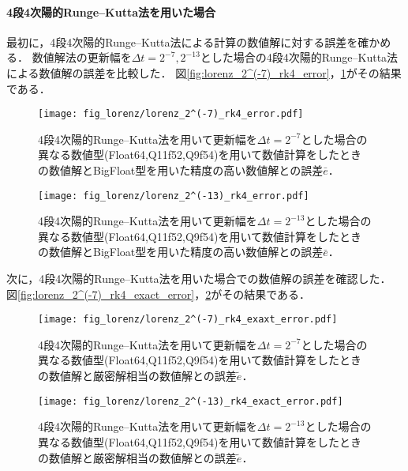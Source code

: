 \paragraph*{4段4次陽的Runge--Kutta法を用いた場合}
最初に，4段4次陽的Runge--Kutta法による計算の数値解に対する誤差を確かめる．
数値解法の更新幅を$\Delta t = 2^{-7},2^{-13}$とした場合の4段4次陽的Runge--Kutta法による数値解の誤差を比較した．
図\ref{fig:lorenz_2^(-7)_rk4_error}，\ref{fig:lorenz_2^(-13)_rk4_error}がその結果である．
\begin{figure}[H]
    \centering
    \begin{minipage}[b]{0.48\columnwidth}
        \centering
        \texttt{[image: fig\_lorenz/lorenz\_2^(-7)\_rk4\_error.pdf]}
        \caption{4段4次陽的Runge--Kutta法を用いて更新幅を$\Delta t = 2^{-7}$とした場合の異なる数値型(Float64,Q11f52,Q9f54)を用いて数値計算をしたときの数値解とBigFloat型を用いた精度の高い数値解との誤差$\bar{e}$．}
        \label{fig:lorenz_2^(-7)_rk4_error}
    \end{minipage}
    \hspace{0.01\columnwidth}
    \begin{minipage}[b]{0.48\columnwidth}
        \centering
        \texttt{[image: fig\_lorenz/lorenz\_2^(-13)\_rk4\_error.pdf]}
        \caption{4段4次陽的Runge--Kutta法を用いて更新幅を$\Delta t =  2^{-13}$とした場合の異なる数値型(Float64,Q11f52,Q9f54)を用いて数値計算をしたときの数値解とBigFloat型を用いた精度の高い数値解との誤差$\bar{e}$．}
        \label{fig:lorenz_2^(-13)_rk4_error}
    \end{minipage}
\end{figure}
次に，4段4次陽的Runge--Kutta法を用いた場合での数値解の誤差を確認した．
図\ref{fig:lorenz_2^(-7)_rk4_exact_error}，\ref{fig:lorenz_2^(-13)_rk4_exact_error}がその結果である．
\begin{figure}[H]
    \centering
    \begin{minipage}[b]{0.48\columnwidth}
        \centering
        \texttt{[image: fig\_lorenz/lorenz\_2^(-7)\_rk4\_exaxt\_error.pdf]}
        \caption{4段4次陽的Runge--Kutta法を用いて更新幅を$\Delta t = 2^{-7}$とした場合の異なる数値型(Float64,Q11f52,Q9f54)を用いて数値計算をしたときの数値解と厳密解相当の数値解との誤差$\tilde{e}$．}
        \label{fig:lorenz_2^(-7)_rk4_exact_error}
    \end{minipage}
    \hspace{0.01\columnwidth}
    \begin{minipage}[b]{0.48\columnwidth}
        \centering
        \texttt{[image: fig\_lorenz/lorenz\_2^(-13)\_rk4\_exact\_error.pdf]}
        \caption{4段4次陽的Runge--Kutta法を用いて更新幅を$\Delta t =  2^{-13}$とした場合の異なる数値型(Float64,Q11f52,Q9f54)を用いて数値計算をしたときの数値解と厳密解相当の数値解との誤差$\tilde{e}$．}
        \label{fig:lorenz_2^(-13)_rk4_exact_error}
    \end{minipage}
\end{figure}

